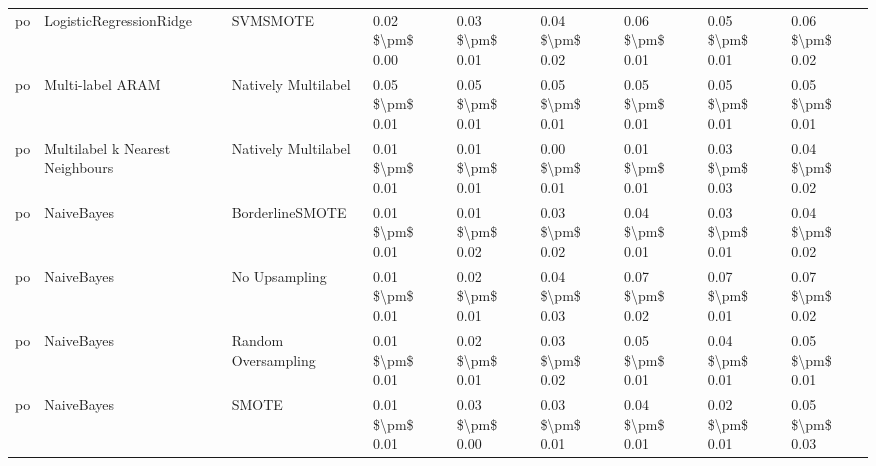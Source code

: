 \begin{tabular}{lllllllll}
      po &         LogisticRegressionRidge &                      SVMSMOTE & 0.02 \$\textbackslash pm\$ 0.00 &           0.03 \$\textbackslash pm\$ 0.01 &       0.04 \$\textbackslash pm\$ 0.02 &        0.06 \$\textbackslash pm\$ 0.01 &                         0.05 \$\textbackslash pm\$ 0.01 &     0.06 \$\textbackslash pm\$ 0.02 \\
      po &                Multi-label ARAM &           Natively Multilabel & 0.05 \$\textbackslash pm\$ 0.01 &           0.05 \$\textbackslash pm\$ 0.01 &       0.05 \$\textbackslash pm\$ 0.01 &        0.05 \$\textbackslash pm\$ 0.01 &                         0.05 \$\textbackslash pm\$ 0.01 &     0.05 \$\textbackslash pm\$ 0.01 \\
      po & Multilabel k Nearest Neighbours &           Natively Multilabel & 0.01 \$\textbackslash pm\$ 0.01 &           0.01 \$\textbackslash pm\$ 0.01 &       0.00 \$\textbackslash pm\$ 0.01 &        0.01 \$\textbackslash pm\$ 0.01 &                         0.03 \$\textbackslash pm\$ 0.03 &     0.04 \$\textbackslash pm\$ 0.02 \\
      po &                      NaiveBayes &               BorderlineSMOTE & 0.01 \$\textbackslash pm\$ 0.01 &           0.01 \$\textbackslash pm\$ 0.02 &       0.03 \$\textbackslash pm\$ 0.02 &        0.04 \$\textbackslash pm\$ 0.01 &                         0.03 \$\textbackslash pm\$ 0.01 &     0.04 \$\textbackslash pm\$ 0.02 \\
      po &                      NaiveBayes &                 No Upsampling & 0.01 \$\textbackslash pm\$ 0.01 &           0.02 \$\textbackslash pm\$ 0.01 &       0.04 \$\textbackslash pm\$ 0.03 &        0.07 \$\textbackslash pm\$ 0.02 &                         0.07 \$\textbackslash pm\$ 0.01 &     0.07 \$\textbackslash pm\$ 0.02 \\
      po &                      NaiveBayes &           Random Oversampling & 0.01 \$\textbackslash pm\$ 0.01 &           0.02 \$\textbackslash pm\$ 0.01 &       0.03 \$\textbackslash pm\$ 0.02 &        0.05 \$\textbackslash pm\$ 0.01 &                         0.04 \$\textbackslash pm\$ 0.01 &     0.05 \$\textbackslash pm\$ 0.01 \\
      po &                      NaiveBayes &                         SMOTE & 0.01 \$\textbackslash pm\$ 0.01 &           0.03 \$\textbackslash pm\$ 0.00 &       0.03 \$\textbackslash pm\$ 0.01 &        0.04 \$\textbackslash pm\$ 0.01 &                         0.02 \$\textbackslash pm\$ 0.01 &     0.05 \$\textbackslash pm\$ 0.03 \\

\end{tabular}
